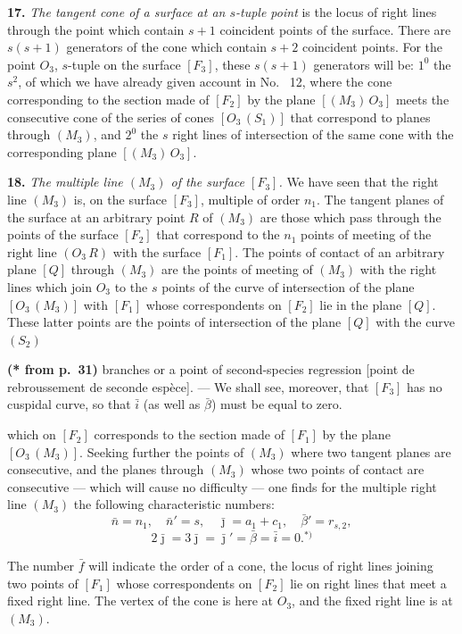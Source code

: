 \documentclass{article}
\begin{document}
\textbf{17.} \emph{The tangent cone of a surface at an $s$-tuple point} is the locus of right lines through the point which contain $s + 1$ coincident points of the surface. There are $s(s + 1)$ generators of the cone which contain $s + 2$ coincident points. For the point $O_3$, $s$-tuple on the surface $[F_3]$, these $s(s + 1)$ generators will be: $1^0$ the $s^2$, of which we have already given account in No.~ 12, where the cone corresponding to the section made of $[F_2]$ by the plane $[(M_3)\,O_3]$ meets the consecutive cone of the series of cones $[O_3\,(S_1)]$ that correspond to planes through $(M_3)$, and $2^0$ the $s$ right lines of intersection of the same cone with the corresponding plane $[(M_3)\,O_3]$.

\textbf{18.} \emph{The multiple line $(M_3)$ of the surface $[F_3]$.} We have seen that the right line $(M_3)$ is, on the surface $[F_3]$, multiple of order $n_1$. The tangent planes of the surface at an arbitrary point $R$ of $(M_3)$ are those which pass through the points of the surface $[F_2]$ that correspond to the $n_1$ points of meeting of the right line $(O_3\,R)$ with the surface $[F_1]$. The points of contact of an arbitrary plane $[Q]$ through $(M_3)$ are the points of meeting of $(M_3)$ with the right lines which join $O_3$ to the $s$ points of the curve of intersection of the plane $[O_3\,(M_3)]$ with $[F_1]$ whose correspondents on $[F_2]$ lie in the plane $[Q]$. These latter points are the points of intersection of the plane $[Q]$ with the curve $(S_2)$

\textbf{(* from p.~31)} branches or a point of second-species regression [point de rebroussement de seconde espèce]. --- We shall see, moreover, that $[F_3]$ has no cuspidal curve, so that $\bar{i}$ (as well as $\bar{\beta}$) must be equal to zero.

which on $[F_2]$ corresponds to the section made of $[F_1]$ by the plane $[O_3\,(M_3)]$. Seeking further the points of $(M_3)$ where two tangent planes are consecutive, and the planes through $(M_3)$ whose two points of contact are consecutive --- which will cause no difficulty --- one finds for the multiple right line $(M_3)$ the following characteristic numbers:
\[
\bar{n} = n_1, \quad \bar{n}' = s, \quad \bar{\jmath} = a_1 + c_1, \quad \bar{\beta}' = r_{s, 2},
\]
\[
2\bar{\jmath} = 3\bar{\jmath} = \bar{\jmath}' = \bar{\beta} = \bar{i} = 0.{}^{*)}
\]

The number $\bar{f}$ will indicate the order of a cone, the locus of right lines joining two points of $[F_1]$ whose correspondents on $[F_2]$ lie on right lines that meet a fixed right line. The vertex of the cone is here at $O_3$, and the fixed right line is at $(M_3)$.
\end{document}
